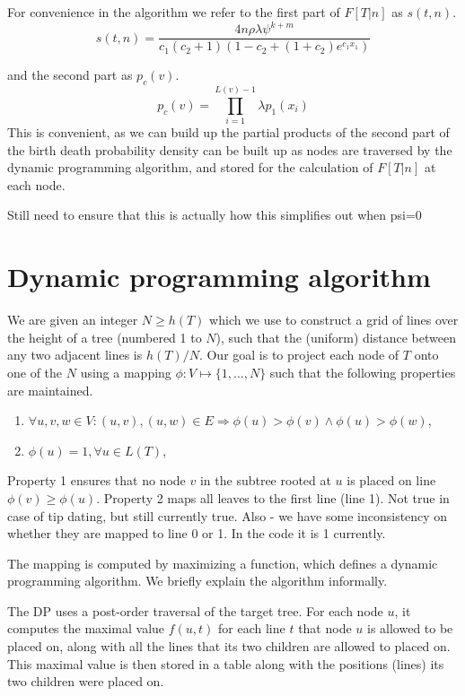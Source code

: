 \documentclass{llncs}
\newcommand{\ejmcomment}[1]{{\color{green} #1}}
\begin{document}
For convenience in the algorithm we refer to the first part of $F[T|n]$ as $s(t,n)$.
$$s(t,n) = \frac{4n\rho\lambda\psi^{k+m}}{c_1(c_2+1)(1-c_2+(1+c_2)e^{c_1x_1})}$$

and the second part as $p_c(v)$.
$$p_{c}(v) = \prod_{i=1}^{L(v)-1}\lambda p_1(x_i)$$
This is convenient, as we can build up the partial products of the second part of the birth death
probability density can be built up as nodes are traversed by
the dynamic programming algorithm, and stored for the calculation of $F[T|n]$ at each node.

\ejmcomment{Still need to ensure that this is actually how this simplifies out when psi=0}

\section{Dynamic programming algorithm}

We are given an integer $N \geq h(T)$ which we use to construct a grid of lines
over the height of a tree (numbered 1 to $N$), such that the (uniform) distance between any two
adjacent lines is $h(T) / N$.  Our goal is to project each node of $T$ onto one
of the $N$ using a mapping $\phi : V \mapsto \{1,\ldots,N\}$ such that the
following properties are maintained.

\begin{enumerate}
\item $\forall u,v,w \in V : (u,v), (u,w) \in E \Rightarrow \phi(u) > \phi(v) \wedge \phi(u) > \phi(w)$,
\item $\phi(u) = 1, \forall u \in L(T)$,
\end{enumerate}

Property 1 ensures that no node $v$ in the subtree rooted at $u$ is placed on
line $\phi(v) \geq \phi(u)$. Property 2 maps all leaves to the first line (line 1).
\ejmcomment{Not true in case of tip dating, but still currently true. 
Also - we have some inconsistency on whether they are mapped to line 0 or 1.
In the code it is 1 currently.}

The mapping is computed by maximizing a function, which defines a
dynamic programming algorithm.  We briefly explain the algorithm informally.

The DP uses a post-order traversal of the target tree. For each node $u$, it
computes the maximal value $f(u,t)$ for each line $t$ that node $u$ is allowed to be
placed on, along with all the lines that its two children are allowed to placed
on. This maximal value is then stored in a table along with the positions (lines) its
two children were placed on. 
\end{document}
